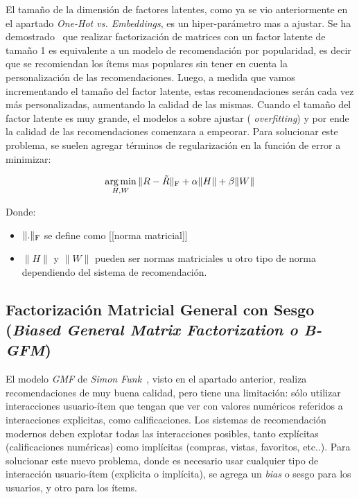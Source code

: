 \documentclass[11pt,a4paper,twoside]{thesis}
\begin{document}
El tamaño de la dimensión de factores latentes, como ya se vio anteriormente en
el apartado \textit{One-Hot vs. Embeddings}, es un hiper-parámetro mas a
ajustar. Se ha demostrado~\cite{embeddingsizedem} que realizar factorización de
matrices con un factor latente de tamaño 1 es equivalente a un modelo de
recomendación por popularidad, es decir que se recomiendan los ítems mas
populares sin tener en cuenta la personalización de las recomendaciones. Luego,
a medida que vamos incrementando el tamaño del factor latente, estas
recomendaciones serán cada vez más personalizadas, aumentando la calidad de las
mismas. Cuando el tamaño del factor latente es muy grande, el modelos a sobre
ajustar (\textit{ overfitting}) y por ende la calidad de las recomendaciones
comenzara a empeorar. Para solucionar este problema, se suelen agregar términos
de regularización en la función de error a minimizar:

\begin{equation}
	\underset{H, W}{\operatorname{arg\,min } }\, \|R - \tilde{R}\|_{\rm F} + \alpha\|H\| + \beta\|W\|
\end{equation}
\begin{description}
	\item[Donde:]
\end{description}
\begin{itemize}
	\item $\|.\|_{\rm F}$ se define como [[norma matricial]]
	\item $\|H\|$ y $\|W\|$ pueden ser normas matriciales u otro tipo de norma dependiendo del sistema de recomendación.
\end{itemize}

\subsection{Factorización Matricial General con Sesgo
	(\textit{Biased General Matrix Factorization o B-GFM})}

El modelo \textit{GMF} de \textit{Simon Funk}~\cite{afm, dlwkrs}, visto en el
apartado anterior, realiza recomendaciones de muy buena calidad, pero tiene una
limitación: sólo utilizar interacciones usuario-ítem que tengan que ver con
valores numéricos referidos a interacciones explicitas, como calificaciones.
Los sistemas de recomendación modernos deben explotar todas las interacciones
posibles, tanto explícitas (calificaciones numéricas) como implícitas (compras,
vistas, favoritos, etc..). Para solucionar este nuevo problema, donde es
necesario usar cualquier tipo de interacción usuario-ítem (explicita o
implícita), se agrega un \textit{bias} o sesgo para los usuarios, y otro para
los ítems.
\end{document}
